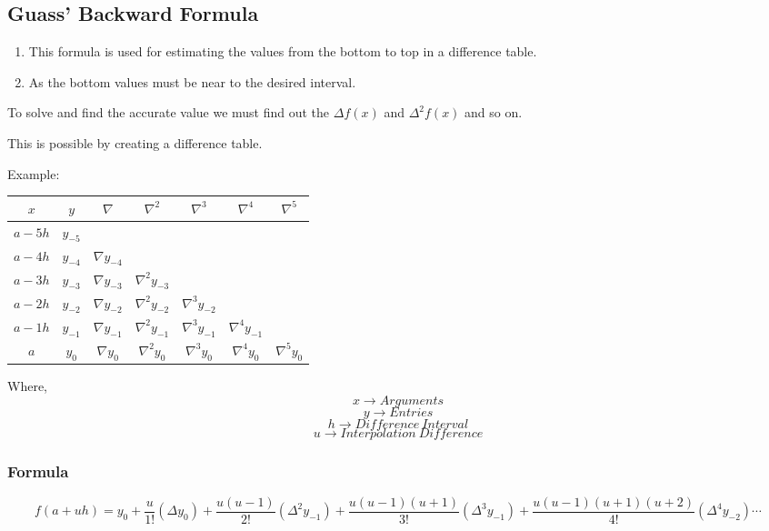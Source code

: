 \subsection{Guass' Backward Formula}

\begin{enumerate}
    \item This formula is used for estimating the values from the bottom to top in a difference table.
    \item As the bottom values must be near to the desired interval.
\end{enumerate}

To solve and find the accurate value we must find out the $\Delta f(x)$ and $\Delta^2 f(x)$ and so on.

This is possible by creating a difference table.

Example:

\begin{center}
    \begin{tabular}{|c|c|c|c|c|c|c|}
        \hline
        $x$ & $y$ & $\nabla$ & $\nabla^2$ & $\nabla^3$ & $\nabla^4$ & $\nabla^5$\\
        \hline
        $a - 5h$ & ${y}_{-5}$ & & & & &\\
        \hline
        $a - 4h$ & ${y}_{-4}$ & $\nabla {y}_{-4}$ & & & &\\
        \hline
        $a - 3h$ & ${y}_{-3}$ & $\nabla {y}_{-3}$ & $\nabla^2 {y}_{-3}$ & & &\\
        \hline
        $a - 2h$ & ${y}_{-2}$ & $\nabla {y}_{-2}$ & $\nabla^2 y_{-2}$ & $\nabla^3 y_{-2}$ & &\\
        \hline
        $a - 1h$ & ${y}_{-1}$ & $\nabla {y}_{-1}$ & $\nabla^2 y_{-1}$ & $\nabla^3 y_{-1}$ & $\nabla^4 {y}_{-1}$ &\\
        \hline
        $a$ & $y_0$ & $\nabla y_0$ & $\nabla^2 y_0$ & $\nabla^3 y_0$ & $\nabla^4 y_0$ & $\nabla^5 y_0$\\
        \hline
    \end{tabular}
    \end{center}

Where,\\
\[x \rightarrow Arguments\]
\[y \rightarrow Entries\]
\[h \rightarrow Difference\ Interval\]
\[u \rightarrow Interpolation\ Difference\]


\subsubsection{Formula}

\[f(a + uh) = y_0 + \frac{u}{1!}(\Delta {y}_{0}) + \frac{u(u-1)}{2!}(\Delta^2 {y}_{-1}) + \frac{u(u-1)(u+1)}{3!}(\Delta^3 {y}_{-1}) + \frac{u(u-1)(u+1)(u+2)}{4!}(\Delta^4 {y}_{-2}) \cdots\]